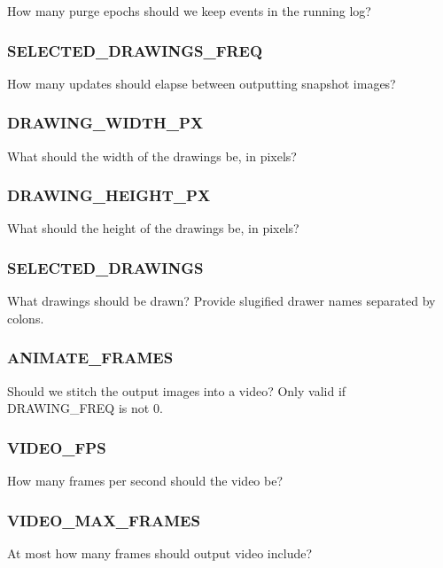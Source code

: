 
How many purge epochs should we keep events in the running log?

\subsubsection{SELECTED\_DRAWINGS\_FREQ}


How many updates should elapse between outputting snapshot images?

\subsubsection{DRAWING\_WIDTH\_PX}


What should the width of the drawings be, in pixels?

\subsubsection{DRAWING\_HEIGHT\_PX}


What should the height of the drawings be, in pixels?

\subsubsection{SELECTED\_DRAWINGS}


What drawings should be drawn?
Provide slugified drawer names separated by colons.

\subsubsection{ANIMATE\_FRAMES}


Should we stitch the output images into a video?
Only valid if DRAWING\_FREQ is not 0.

\subsubsection{VIDEO\_FPS}


How many frames per second should the video be?

\subsubsection{VIDEO\_MAX\_FRAMES}


At most how many frames should output video include?
